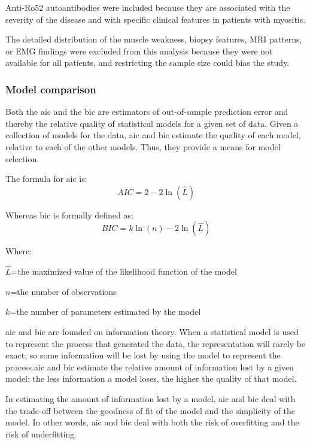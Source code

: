 Anti-Ro52 autoantibodies were included because they are associated with the severity of the disease and with specific clinical features in patients with myositis.\cite{PinalFernandez2017a,Vancsa2009,Marie2012,Bauhammer2016}

The detailed distribution of the muscle weakness, biopsy features, MRI patterns, or EMG findings were excluded from this analysis because they were not available for all patients, and restricting the sample size could bias the study.

\subsubsection{Model comparison}
Both the \gls{aic} and the \gls{bic} are estimators of out-of-sample prediction error and thereby the relative quality of statistical models for a given set of data.\cite{Akaike1974,Schwarz1978} Given a collection of models for the data, \gls{aic} and \gls{bic} estimate the quality of each model, relative to each of the other models. Thus, they provide a means for model selection.

The formula for \gls{aic} is:
\[AIC =  2-2\ln(\hat{L})\]

Whereas \gls{bic} is formally defined as:
\[BIC =  k\ln(n)-2\ln(\hat{L})\]

Where:
\begin{description}
	\item $\hat{L}$=the maximized value of the likelihood function of the model
	
	\item $n$=the number of observations
	
	\item $k$=the number of parameters estimated by the model
\end{description}

\gls{aic} and \gls{bic} are founded on information theory. When a statistical model is used to represent the process that generated the data, the representation will rarely be exact; so some information will be lost by using the model to represent the process.\gls{aic} and \gls{bic} estimate the relative amount of information lost by a given model: the less information a model loses, the higher the quality of that model.

In estimating the amount of information lost by a model, \gls{aic} and \gls{bic} deal with the trade-off between the goodness of fit of the model and the simplicity of the model. In other words, \gls{aic} and \gls{bic} deal with both the risk of overfitting and the risk of underfitting.

